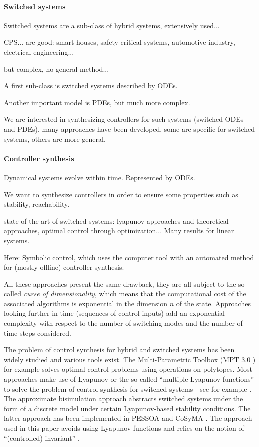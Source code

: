 \paragraph{Switched systems}

Switched systems are a sub-class of hybrid systems, extensively used...

CPS... are good: smart houses, safety critical systems, automotive industry, electrical engineering... 

but complex, no general method...

A first sub-class is switched systems described by ODEs. 

Another important model is PDEs, but much more complex.

We are interested in synthesizing controllers for such systems (switched ODEs and PDEs). 
many approaches have been developed,
some are specific for switched systems, others are more general.

\paragraph{Controller synthesis}

Dynamical systems evolve within time. Represented by ODEs.

We want to synthesize controllers in order to ensure some properties such as stability, reachability.



state of the art of switched systems: lyapunov approaches and theoretical approaches,
optimal control through optimization... 
Many results for linear systems. 


Here:  Symbolic control, which uses the computer tool with an automated method for 
(mostly offline) controller synthesis. 


All these approaches present the same drawback, they are all subject to the so called 
{\em curse of dimensionality}, which means that the computational cost of 
the associated algorithms is exponential in the dimension $n$ of the state. 
Approaches looking further in time (sequences of control inputs) add an exponential 
complexity with respect to the number of switching modes and the number 
of time steps considered.


The problem of control synthesis 
for hybrid and switched systems has been widely studied and various tools exist. 
The Multi-Parametric Toolbox (MPT 3.0 \cite{MPT3}) for example solves optimal control problems
using operations on polytopes.
Most approaches make use of Lyapunov or the so-called ``multiple Lyapunov functions''
to solve the problem of
control synthesis for switched systems - see for example \cite{TAB09}. 
The approximate bisimulation approach 
abstracts switched systems under the form
of a discrete model \cite{GIR10a,GIR10b} under certain Lyapunov-based stability conditions.
The latter approach has been implemented in PESSOA \cite{PESSOA} and CoSyMA \cite{CoSyMA}.
The approach used in this paper avoids using Lyapunov functions and relies on the notion
of ``(controlled) invariant'' \cite{BLA99}.


